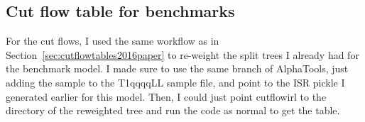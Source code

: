 \subsection{Cut flow table for benchmarks}

For the cut flows, I used the same workflow as in Section~\ref{sec:cutflowtables2016paper} to re-weight the split trees I already had for the benchmark model. I made sure to use the same branch of AlphaTools, just adding the sample to the T1qqqqLL sample file, and point to the ISR pickle I generated earlier for this model. Then, I could just point cutflowirl to the directory of the reweighted tree and run the code as normal to get the table.

\begin{table}[htbp]
\caption{Cut flow table for \texttt{T2tt-4bd} model.}
\end{table}

